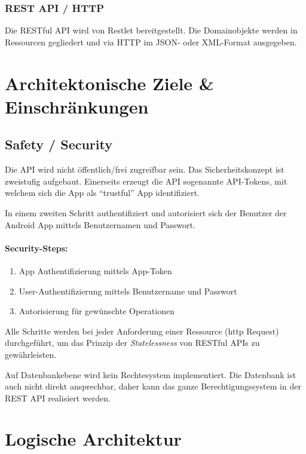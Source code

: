 \documentclass[10pt,a4paper]{scrartcl}
\begin{document}
\subsubsection{REST API / HTTP}

Die RESTful API wird von Restlet bereitgestellt. Die Domainobjekte werden in Ressourcen gegliedert
und via HTTP im JSON- oder XML-Format ausgegeben.


\section{Architektonische Ziele \& Einschränkungen}

\subsection{Safety / Security}

Die API wird nicht öffentlich/frei zugreifbar sein. Das Sicherheitskonzept ist zweistufig aufgebaut.
Einerseits erzeugt die API sogenannte API-Tokens, mit welchem sich die App als "`trustful"' App identifiziert.

In einem zweiten Schritt authentifiziert und autorisiert sich der Benutzer der Android App mittels
Benutzernamen und Passwort.

\paragraph*{Security-Steps:}

\begin{enumerate}
	\item App Authentifizierung mittels App-Token
	\item User-Authentifizierung mittels Benutzername und Passwort
	\item Autorisierung für gewünschte Operationen
\end{enumerate}
 
Alle Schritte werden bei jeder Anforderung einer Ressource (http Request) durchgeführt, um das
Prinzip der \textit{Statelessness} von RESTful APIs zu gewährleisten.

Auf Datenbankebene wird kein Rechtesystem implementiert. Die Datenbank ist auch nicht direkt
ansprechbar, daher kann das ganze Berechtigungssystem in der REST API realisiert werden.


\section{Logische Architektur}
\end{document}
